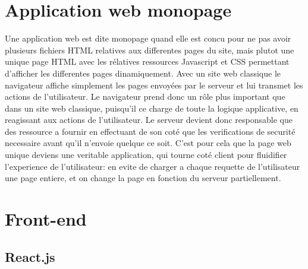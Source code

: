 \documentclass[a4paper,12pt]{report}
\theoremstyle{break}
\theoremstyle{break}
\theoremstyle{break}
\theoremstyle{break}
\theoremstyle{definition}
\theoremstyle{remark}
\begin{document}
\section{Application web monopage}
Une application web est dite monopage quand elle est concu pour ne pas avoir plusieurs fichiers
HTML relatives aux differentes pages du site, mais plutot une unique page HTML avec les rélatives ressources
Javascript et CSS permettant d'afficher les differentes pages dinamiquement.
Avec un site web classique le navigateur affiche simplement les pages envoyées par le serveur et lui transmet les actions de l’utilisateur.
Le navigateur prend donc un rôle plus important que dans un site web classique, puisqu'il ce charge de toute la logique applicative,
en reagissant aux actions de l'utilisateur. Le serveur devient donc responsable que des ressource a fournir en effectuant de son coté
que les verifications de securité necessaire avant qu'il n'envoie quelque ce soit.
C'est pour cela que la page web unique deviens une veritable application, qui tourne coté client pour fluidifier l'experience de l'utilisateur:
en evite de charger a chaque requette de l'utilisateur une page entiere, et on change la page en fonction du serveur partiellement.

\section{Front-end }
\subsection{React.js}
\end{document}
